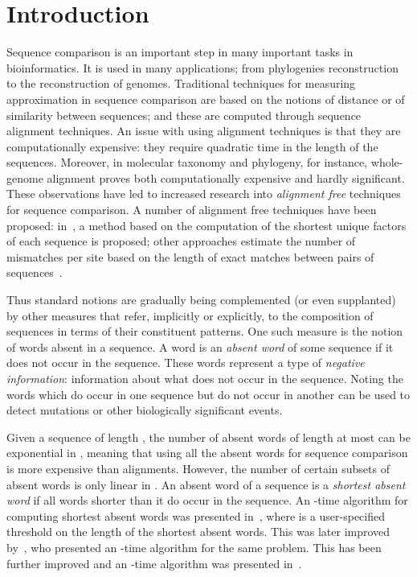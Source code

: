 \documentclass{llncs}
\begin{document}
\section{Introduction}
\label{sec:intro}
  Sequence comparison is an important step in many important tasks in bioinformatics.
  It is used in many applications; from phylogenies reconstruction to the reconstruction of genomes.
  Traditional techniques for measuring approximation in sequence comparison are based on the notions of distance or of similarity between sequences;
  and these are computed through sequence alignment techniques.
  An issue with using alignment techniques is that they are computationally expensive: they require quadratic time in the length of the sequences.
  Moreover, in molecular taxonomy and phylogeny, for instance, whole-genome alignment proves both computationally expensive and hardly significant.
  These observations have led to increased research into \textit{alignment free} techniques for sequence comparison.
  A number of alignment free techniques have been proposed: in~\cite{HauboldPMW05}, a 
  method based on the computation of the shortest unique factors of each sequence is proposed; other approaches estimate the number of mismatches per site based on the length 
  of exact matches between pairs of sequences~\cite{Domazet-Loso:2009:EEP:1671627.1671629}.
  
  Thus standard notions are gradually being complemented (or even supplanted) by other measures that refer, implicitly or explicitly, to the 
  composition of sequences in terms of their constituent patterns. One such measure is the notion of words absent in a sequence.
  A word is an \textit{absent word} of some sequence if it does not occur in the sequence. 
  These words represent a type of \textit{negative information}: information about what does not occur in the sequence.
  Noting the words which do occur in one sequence but do not occur in another can be used to detect mutations or other biologically significant events.

  Given a sequence of length , the number of absent words of length at most  can be exponential in , meaning that using all the absent words for 
  sequence comparison is more expensive than alignments. However, the number of certain subsets of absent words is only linear in .
  An absent word of a sequence is a \textit{shortest absent word} if all words shorter than it do occur in the sequence.
  An -time algorithm for computing shortest absent words was presented in~\cite{Hampikian_absentsequences:}, 
  where  is a user-specified threshold on the length of the shortest absent words. This was later improved by~\cite{abwords}, who presented an -time algorithm for the same problem. 
  This has been further improved and an -time algorithm was presented in~\cite{Wu2010596}.
  
\end{document}
